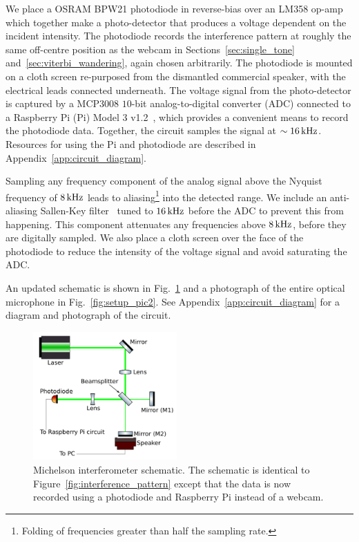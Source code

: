 \documentclass[paper-main.tex]{subfiles}
\begin{document}
We place a OSRAM BPW21 photodiode in reverse-bias over an LM358 op-amp which together make a photo-detector that produces a voltage dependent on the incident intensity. 
The photodiode records the interference pattern at roughly the same off-centre position as the webcam in Sections~\ref{sec:single_tone} and~\ref{sec:viterbi_wandering}, again chosen arbitrarily.
The photodiode is mounted on a cloth screen re-purposed from the dismantled commercial speaker, with the electrical leads connected underneath. 
The voltage signal from the photo-detector is captured by a MCP3008 $10$-bit analog-to-digital converter (ADC) connected to a Raspberry Pi (Pi) Model 3 v1.2~\cite{RaspberryPi:online}, which provides a convenient means to record the photodiode data.
Together, the circuit samples the signal at $\sim 16\,{\rm kHz}$. Resources for using the Pi and photodiode are described in Appendix~\ref{app:circuit_diagram}.

Sampling any frequency component of the analog signal above the Nyquist frequency of $8\,{\rm kHz}$ leads to aliasing\footnote{Folding of frequencies greater than half the sampling rate.} into the detected range. We include an anti-aliasing Sallen-Key filter~\cite{sallen_key_filter} tuned to $16\,{\rm kHz}$ before the ADC to prevent this from happening.
This component attenuates any frequencies above $8\,{\rm kHz}$, before they are digitally sampled. We also place a cloth screen over the face of the photodiode to reduce the intensity of the voltage signal and avoid saturating the ADC.

An updated schematic is shown in Fig.~\ref{fig:ifo_schematic_podo} and a photograph of the entire optical microphone in Fig.~\ref{fig:setup_pic2}.
See Appendix~\ref{app:circuit_diagram} for a diagram and photograph of the circuit. 


\begin{figure}
	\includegraphics[width=0.49\textwidth]{figures/ifo_schematic_photodiode_edit.pdf}
	\caption{
Michelson interferometer schematic. 
The schematic is identical to Figure~\ref{fig:interference_pattern} except that the data is now recorded using a photodiode and Raspberry Pi instead of a webcam. 
}
	\label{fig:ifo_schematic_podo}
\end{figure}
\end{document}

